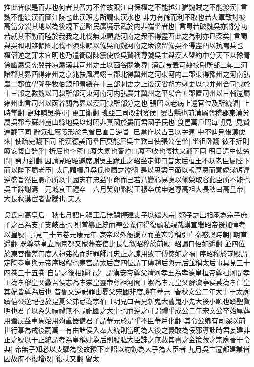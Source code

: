 推此皆似是而非也何者其智力不侔故限江自保權之不能越江猶魏賊之不能渡漢|{
	言魏不能渡漢而圖江陵也此漢班志所謂東漢水也}
非力有餘而利不取也若大軍致討彼高當分裂其地以為後規下當略民廣境示武於内非端坐者也|{
	言蜀若破魏吳亦將分功}
若就其不動而睦於我我之北伐無東顧憂河南之衆不得盡西此之為利亦已深矣|{
	言蜀與吳和則雖傾國北伐不須東顧以備吳而魏河南之衆欲留備吳不得盡西以抗蜀兵也}
權僭逆之罪未宜明也乃遣衛尉陳震使於吳賀稱尊號吳主與漢人盟約中分天下以豫青徐幽屬吳兖冀并凉屬漢其司州之土以函谷關為界|{
	漢武帝置司隸校尉所部三輔三河諸郡其界西得雍州之京兆扶風馮翊三郡北得冀州之河東河内二郡東得豫州之河南弘農二郡位望隆乎牧伯銀印青綬在十三部刺史之上後漢省朔方刺史以隸并州合司隸於十三部之數魏以司隸所部河東河南河内弘農并冀州之平陽合五郡置司州以三輔還屬雍州此言司州以函谷關為界以漢司隸所部分之也}
張昭以老病上還官位及所統領|{
	上時掌翻}
更拜輔吳將軍|{
	更工衡翻}
班亞三司改封婁侯|{
	婁古縣也前漢屬會稽郡東漢分屬吳郡今蘇州崑山縣地吳以封昭非真國於婁而君國子民也}
食邑萬戶昭每朝見|{
	見賢遍翻下同}
辭氣壯厲義形於色曾已直言逆旨|{
	已當作以古已以字通}
中不進見後漢使來|{
	使疏吏翻下同}
稱漢德美而羣臣莫能屈吳主歎曰使張公在坐|{
	坐徂卧翻}
彼不折則廢安復自誇乎|{
	折屈也李奇曰廢失氣也晉灼曰廢不收也復扶又翻下同}
明日遣中使勞問|{
	勞力到翻}
因請見昭昭避席謝吳主跪止之昭坐定仰曰昔太后桓王不以老臣屬陛下而以陛下屬老臣|{
	太后謂權母吳氏也屬之欲翻}
是以思盡臣節以報厚恩而意慮淺短違逆盛旨然臣愚心所以事國志在忠益畢命而已若乃變心易慮以偷榮取容此臣所不能也吳主辭謝焉　元城哀王禮卒　六月癸卯繁陽王穆卒戊申追尊高祖大長秋曰高皇帝|{
	大長秋漢宦者曹騰也}
夫人

吳氏曰高皇后　秋七月詔曰禮王后無嗣擇建支子以繼大宗|{
	嫡子之出相承為宗子庶子之出為支子支岐出也}
則當纂正統而奉公義何得復顧私親哉漢宣繼昭帝後加悼考以皇號|{
	事見二十五卷元康元年}
哀帝以外藩援立而董宏等稱引亡秦惑誤時朝|{
	朝直遥翻}
既尊恭皇立廟京都又寵藩妾使比長信叙昭穆於前殿|{
	昭讀曰佋如遥翻}
並四位於東宫僭差無度人神弗祐而非罪師丹忠正之諫用致丁傅焚如之禍|{
	序昭穆於前殿謂定陶恭皇與元帝序昭穆也東宫謂太后宫四位謂丁傳趙后與元后並稱太后事具見三十四卷三十五卷}
自是之後相踵行之|{
	謂漢安帝尊父清河孝王為孝德皇桓帝尊祖河間孝王為孝穆皇父蠡吾侯志為孝崇皇靈帝尊祖河間王淑為孝元皇父解瀆亭侯萇為孝仁皇其妃皆尊為后也}
昔魯文逆祀罪由夏父宋國非度譏在華元|{
	春秋文公二年大事于太廟躋僖公逆祀也於是夏父弗忌為宗伯且明見曰吾見新鬼大舊鬼小先大後小順也躋聖賢明也君子以為失禮禮無不順祀國之大事也而逆之可謂禮乎成公二年宋文公卒始厚葬用蜃炭益車馬始用殉重器備君子謂華元於是乎不臣華戶化翻}
其令公卿有司深以前世行事為戒後嗣萬一有由諸侯入奉大統則當明為人後之義敢為佞邪導諛時君妄建非正之號以干正統謂考為皇稱妣為后則股肱大臣誅之無赦其書之金策藏之宗廟著于令典|{
	帝無子知必以支孽為後故豫下此詔以約飭為人子為人臣者}
九月吳主遷都建業皆因故府不復增改|{
	復扶又翻}
留太

